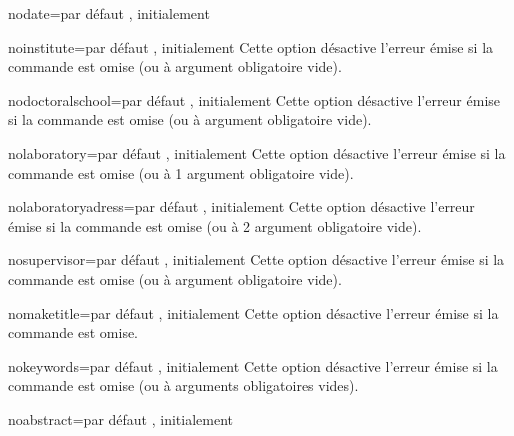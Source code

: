 \begin{description}
\begin{docKey}{nodate}{=\textbar{}}{par défaut
      , initialement }
  \end{docKey}
  \begin{docKey}{noinstitute}{=\textbar{}}{par
      défaut , initialement }
    Cette option désactive l'erreur émise si la commande  est
    omise (ou à argument obligatoire vide).
  \end{docKey}
  \begin{docKey}{nodoctoralschool}{=\textbar{}}{par
      défaut , initialement }
    Cette option désactive l'erreur émise si la commande
     est omise (ou à argument obligatoire vide).
  \end{docKey}
  \begin{docKey}{nolaboratory}{=\textbar{}}{par
      défaut , initialement }
    Cette option désactive l'erreur émise si la commande 
    est omise (ou à 1\ier{} argument obligatoire vide).
  \end{docKey}
  \begin{docKey}{nolaboratoryadress}{=\textbar{}}{par
      défaut , initialement }
    Cette option désactive l'erreur émise si la commande 
    est omise (ou à 2\ieme{} argument obligatoire vide).
  \end{docKey}
  \begin{docKey}{nosupervisor}{=\textbar{}}{par
      défaut , initialement }
    Cette option désactive l'erreur émise si la commande 
    est omise (ou à argument obligatoire vide).
  \end{docKey}
  \begin{docKey}{nomaketitle}{=\textbar{}}{par
      défaut , initialement }
    Cette option désactive l'erreur émise si la commande  est
    omise.
  \end{docKey}
  \begin{docKey}{nokeywords}{=\textbar{}}{par
      défaut , initialement }
    Cette option désactive l'erreur émise si la commande  est
    omise (ou à arguments obligatoires vides).
  \end{docKey}
  \begin{docKey}{noabstract}{=\textbar{}}{par
      défaut , initialement }

\end{docKey}
\end{description}
